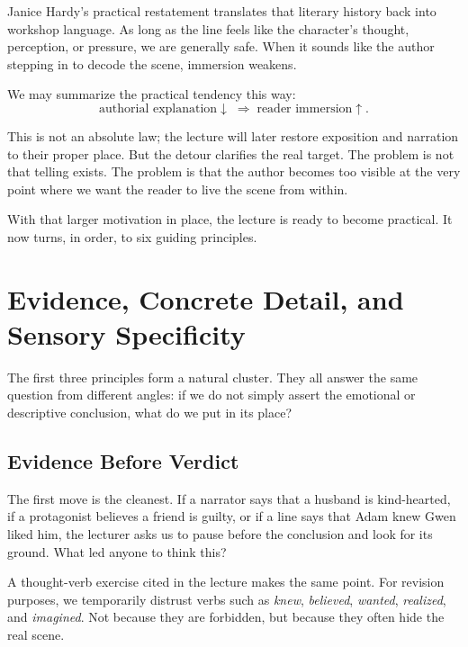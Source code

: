 Janice Hardy's practical restatement translates that literary history back into workshop language. As long as the line feels like the character's thought, perception, or pressure, we are generally safe. When it sounds like the author stepping in to decode the scene, immersion weakens.

We may summarize the practical tendency this way:
\begin{equation}
\text{authorial explanation} \downarrow \;\Longrightarrow\; \text{reader immersion} \uparrow.
\end{equation}

This is not an absolute law; the lecture will later restore exposition and narration to their proper place. But the detour clarifies the real target. The problem is not that telling exists. The problem is that the author becomes too visible at the very point where we want the reader to live the scene from within.

With that larger motivation in place, the lecture is ready to become practical. It now turns, in order, to six guiding principles.

\section{Evidence, Concrete Detail, and Sensory Specificity}

The first three principles form a natural cluster. They all answer the same question from different angles: if we do not simply assert the emotional or descriptive conclusion, what do we put in its place?

\subsection{Evidence Before Verdict}

The first move is the cleanest. If a narrator says that a husband is kind-hearted, if a protagonist believes a friend is guilty, or if a line says that Adam knew Gwen liked him, the lecturer asks us to pause before the conclusion and look for its ground. What led anyone to think this?

A thought-verb exercise cited in the lecture makes the same point. For revision purposes, we temporarily distrust verbs such as \emph{knew}, \emph{believed}, \emph{wanted}, \emph{realized}, and \emph{imagined}. Not because they are forbidden, but because they often hide the real scene.

